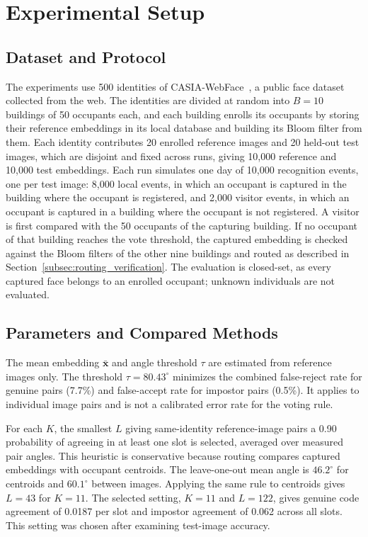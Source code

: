 \documentclass[pdflatex,sn-mathphys-num]{sn-jnl}%
\theoremstyle{thmstyleone}%
\theoremstyle{thmstyletwo}%
\theoremstyle{thmstylethree}%
\begin{document}

\section{Experimental Setup}
\label{sec:setup}

\subsection{Dataset and Protocol}

The experiments use 500 identities of CASIA-WebFace~\cite{yi2014}, a public face dataset collected from the web. The identities are divided at random into $B=10$ buildings of 50 occupants each, and each building enrolls its occupants by storing their reference embeddings in its local database and building its Bloom filter from them. Each identity contributes 20 enrolled reference images and 20 held-out test images, which are disjoint and fixed across runs, giving 10,000 reference and 10,000 test embeddings. Each run simulates one day of 10,000 recognition events, one per test image: 8,000 local events, in which an occupant is captured in the building where the occupant is registered, and 2,000 visitor events, in which an occupant is captured in a building where the occupant is not registered. A visitor is first compared with the 50 occupants of the capturing building. If no occupant of that building reaches the vote threshold, the captured embedding is checked against the Bloom filters of the other nine buildings and routed as described in Section~\ref{subsec:routing_verification}. The evaluation is closed-set, as every captured face belongs to an enrolled occupant; unknown individuals are not evaluated.


\subsection{Parameters and Compared Methods}

The mean embedding $\bar{\mathbf{x}}$ and angle threshold $\tau$ are estimated from reference images only. The threshold $\tau=80.43^{\circ}$ minimizes the combined false-reject rate for genuine pairs (7.7\%) and false-accept rate for impostor pairs (0.5\%). It applies to individual image pairs and is not a calibrated error rate for the voting rule.

For each $K$, the smallest $L$ giving same-identity reference-image pairs a 0.90 probability of agreeing in at least one slot is selected, averaged over measured pair angles. This heuristic is conservative because routing compares captured embeddings with occupant centroids. The leave-one-out mean angle is $46.2^{\circ}$ for centroids and $60.1^{\circ}$ between images. Applying the same rule to centroids gives $L=43$ for $K=11$. The selected setting, $K=11$ and $L=122$, gives genuine code agreement of 0.0187 per slot and impostor agreement of 0.062 across all slots. This setting was chosen after examining test-image accuracy.
\end{document}
